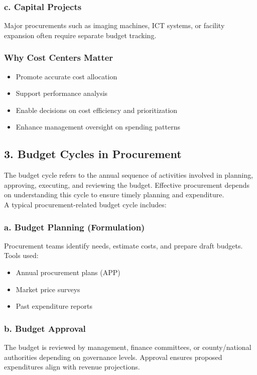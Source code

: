 \documentclass[10pt]{article}
\begin{document}
\subsubsection*{c. Capital Projects}
Major procurements such as imaging machines, ICT systems, or facility expansion often require separate budget tracking.

\subsubsection*{Why Cost Centers Matter}
\begin{itemize}
  \item Promote accurate cost allocation
  \item Support performance analysis
  \item Enable decisions on cost efficiency and prioritization
  \item Enhance management oversight on spending patterns
\end{itemize}

\subsection*{3. Budget Cycles in Procurement}
The budget cycle refers to the annual sequence of activities involved in planning, approving, executing, and reviewing the budget. Effective procurement depends on understanding this cycle to ensure timely planning and expenditure.\\
A typical procurement-related budget cycle includes:

\subsubsection*{a. Budget Planning (Formulation)}
Procurement teams identify needs, estimate costs, and prepare draft budgets.\\
Tools used:

\begin{itemize}
  \item Annual procurement plans (APP)
  \item Market price surveys
  \item Past expenditure reports
\end{itemize}

\subsubsection*{b. Budget Approval}
The budget is reviewed by management, finance committees, or county/national authorities depending on governance levels. Approval ensures proposed expenditures align with revenue projections.
\end{document}
